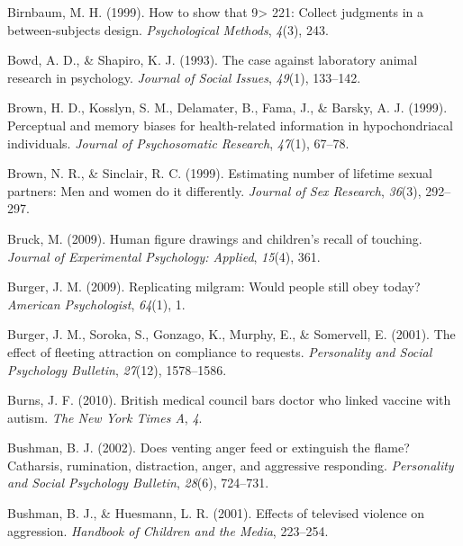 \documentclass[
]{krantz}
\newlength{\cslhangindent}
\newlength{\cslentryspacingunit} %
\newenvironment{CSLReferences}[2] %
 {%
  \setlength{\parindent}{0pt}
  \ifodd #1
  \let\oldpar\par
  \def\par{\hangindent=\cslhangindent\oldpar}
  \fi
  \setlength{\parskip}{#2\cslentryspacingunit}
 }%
 {}
\begin{document}
\begin{CSLReferences}{1}{0}
\leavevmode{}%
Birnbaum, M. H. (1999). How to show that 9\textgreater{} 221: Collect judgments in a between-subjects design. \emph{Psychological Methods}, \emph{4}(3), 243.

\leavevmode{}%
Bowd, A. D., \& Shapiro, K. J. (1993). The case against laboratory animal research in psychology. \emph{Journal of Social Issues}, \emph{49}(1), 133--142.

\leavevmode{}%
Brown, H. D., Kosslyn, S. M., Delamater, B., Fama, J., \& Barsky, A. J. (1999). Perceptual and memory biases for health-related information in hypochondriacal individuals. \emph{Journal of Psychosomatic Research}, \emph{47}(1), 67--78.

\leavevmode{}%
Brown, N. R., \& Sinclair, R. C. (1999). Estimating number of lifetime sexual partners: Men and women do it differently. \emph{Journal of Sex Research}, \emph{36}(3), 292--297.

\leavevmode{}%
Bruck, M. (2009). Human figure drawings and children's recall of touching. \emph{Journal of Experimental Psychology: Applied}, \emph{15}(4), 361.

\leavevmode{}%
Burger, J. M. (2009). Replicating milgram: Would people still obey today? \emph{American Psychologist}, \emph{64}(1), 1.

\leavevmode{}%
Burger, J. M., Soroka, S., Gonzago, K., Murphy, E., \& Somervell, E. (2001). The effect of fleeting attraction on compliance to requests. \emph{Personality and Social Psychology Bulletin}, \emph{27}(12), 1578--1586.

\leavevmode{}%
Burns, J. F. (2010). British medical council bars doctor who linked vaccine with autism. \emph{The New York Times A}, \emph{4}.

\leavevmode{}%
Bushman, B. J. (2002). Does venting anger feed or extinguish the flame? Catharsis, rumination, distraction, anger, and aggressive responding. \emph{Personality and Social Psychology Bulletin}, \emph{28}(6), 724--731.

\leavevmode{}%
Bushman, B. J., \& Huesmann, L. R. (2001). Effects of televised violence on aggression. \emph{Handbook of Children and the Media}, 223--254.


\end{CSLReferences}
\end{document}
